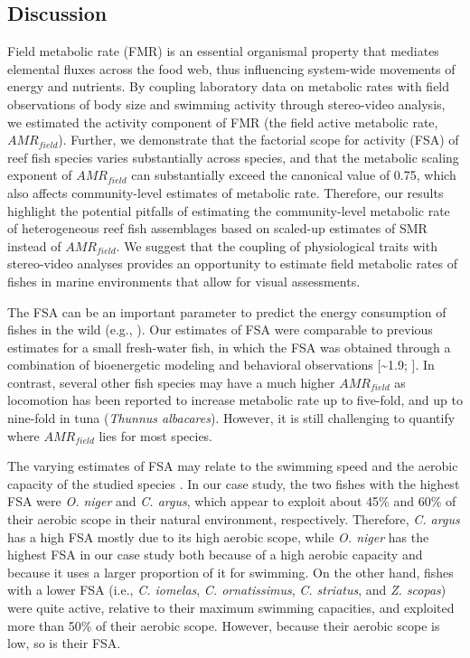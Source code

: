 \documentclass[
]{article}
\begin{document}
\newpage

\hypertarget{discussion}{%
\subsection{Discussion}\label{discussion}}

Field metabolic rate (FMR) is an essential organismal property that
mediates elemental fluxes across the food web, thus influencing
system-wide movements of energy and nutrients. By coupling laboratory
data on metabolic rates with field observations of body size and
swimming activity through stereo-video analysis, we estimated the
activity component of FMR (the field active metabolic rate,
\(AMR_{field}\)). Further, we demonstrate that the factorial scope for
activity (FSA) of reef fish species varies substantially across species,
and that the metabolic scaling exponent of \(AMR_{field}\) can
substantially exceed the canonical value of 0.75, which also affects
community-level estimates of metabolic rate. Therefore, our results
highlight the potential pitfalls of estimating the community-level
metabolic rate of heterogeneous reef fish assemblages based on scaled-up
estimates of SMR instead of \(AMR_{field}\). We suggest that the
coupling of physiological traits with stereo-video analyses provides an
opportunity to estimate field metabolic rates of fishes in marine
environments that allow for visual assessments.

\par

The FSA can be an important parameter to predict the energy consumption
of fishes in the wild (e.g., \citet{Schiettekatte2020}). Our estimates
of FSA were comparable to previous estimates for a small fresh-water
fish, in which the FSA was obtained through a combination of
bioenergetic modeling and behavioral observations {[}\textasciitilde1.9;
\citet{Trudel1996}{]}. In contrast, several other fish species may have
a much higher \(AMR_{field}\) as locomotion has been reported to
increase metabolic rate up to five-fold, and up to nine-fold in tuna
(\emph{Thunnus albacares})\citep{Brill1991, Chabot2016}. However, it is
still challenging to quantify where \(AMR_{field}\) lies for most
species.

The varying estimates of FSA may relate to the swimming speed and the
aerobic capacity of the studied species \citep{Clark2013}. In our case
study, the two fishes with the highest FSA were \emph{O. niger} and
\emph{C. argus}, which appear to exploit about 45\% and 60\% of their
aerobic scope in their natural environment, respectively. Therefore,
\emph{C. argus} has a high FSA mostly due to its high aerobic scope,
while \emph{O. niger} has the highest FSA in our case study both because
of a high aerobic capacity and because it uses a larger proportion of it
for swimming. On the other hand, fishes with a lower FSA (i.e., \emph{C.
iomelas}, \emph{C. ornatissimus}, \emph{C. striatus}, and \emph{Z.
scopas}) were quite active, relative to their maximum swimming
capacities, and exploited more than 50\% of their aerobic scope.
However, because their aerobic scope is low, so is their FSA.
\end{document}
